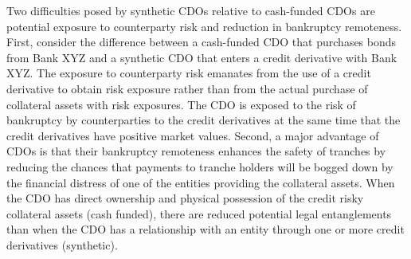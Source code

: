 \documentclass[11pt]{article}
\begin{document}
Two difficulties posed by synthetic CDOs relative to cash-funded CDOs are potential exposure to counterparty risk and reduction in bankruptcy remoteness. First, consider the difference between a cash-funded CDO that purchases bonds from Bank XYZ and a synthetic CDO that enters a credit derivative with Bank XYZ. The exposure to counterparty risk emanates from the use of a credit derivative to obtain risk exposure rather than from the actual purchase of collateral assets with risk exposures. The CDO is exposed to the risk of bankruptcy by counterparties to the credit derivatives at the same time that the credit derivatives have positive market values. Second, a major advantage of CDOs is that their bankruptcy remoteness enhances the safety of tranches by reducing the chances that payments to tranche holders will be bogged down by the financial distress of one of the entities providing the collateral assets. When the CDO has direct ownership and physical possession of the credit risky collateral assets (cash funded), there are reduced potential legal entanglements than when the CDO has a relationship with an entity through one or more credit derivatives (synthetic).
\end{document}
